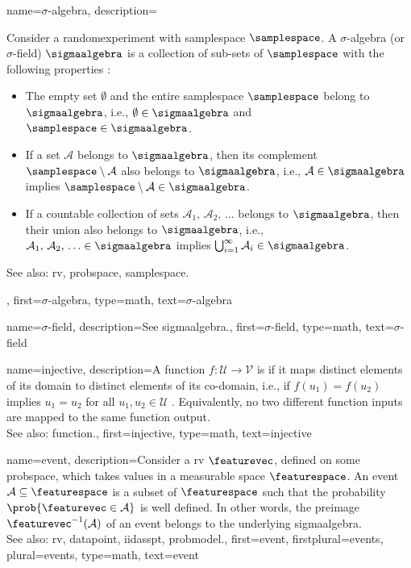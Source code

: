 {name={$\sigma$-algebra}, 
	description={Consider a \gls{randomexperiment} with \gls{samplespace} $\samplespace$. 
		A $\sigma$-algebra (or $\sigma$-field) $\sigmaalgebra$ 
		is a collection of sub-sets of $\samplespace$ with the following properties 
		\cite{RudinBook,BillingsleyProbMeasure,durrett2010probability}:
		 \begin{itemize}
		 	\item The empty set $\emptyset$ and the entire \gls{samplespace} 
		 	$\samplespace$ belong to $\sigmaalgebra$, i.e., $\emptyset \in \sigmaalgebra$ and $\samplespace \in \sigmaalgebra$.
		 	\item If a set $\mathcal{A}$ belongs to $\sigmaalgebra$, then its complement 
		 	$\samplespace \setminus \mathcal{A}$ also belongs to $\sigmaalgebra$, i.e., 
		 	$\mathcal{A} \in \sigmaalgebra$ implies $\samplespace \setminus \mathcal{A} \in \sigmaalgebra$.
		 	\item If a countable collection of sets $\mathcal{A}_1, \,\mathcal{A}_2, \,\ldots$ belongs 
			to $\sigmaalgebra$, 
		 	then their union also belongs to $\sigmaalgebra$, i.e.,
		 	$\mathcal{A}_1, \,\mathcal{A}_2, \,\ldots \in \sigmaalgebra$ implies 
		 	$\bigcup_{i=1}^{\infty} \mathcal{A}_i \in \sigmaalgebra$.	
		 \end{itemize}			 
		See also: \gls{rv}, \gls{probspace}, \gls{samplespace}.},
	first={$\sigma$-algebra},
	type=math, 
	text={$\sigma$-algebra} 
}

{name={$\sigma$-field}, 
	description={See \gls{sigmaalgebra}.}, 
	first={$\sigma$-field},
	type=math,
	text={$\sigma$-field} 
}


{name={injective}, 
	description={A \gls{function} $f: \mathcal{U} \rightarrow \mathcal{V}$ is 
	if it maps distinct elements of its \gls{domain} to distinct elements 
	of its \gls{co-domain}, 
    i.e., if $f(u_1) = f(u_2)$ implies $u_1 = u_2$ for all $u_1, u_2 \in \mathcal{U}$ 
        \cite{HalmosSet}. 
    Equivalently, no two different \gls{function} inputs are mapped to the same \gls{function} output.
				\\
		See also: \gls{function}.},
	first={injective},
	type=math,
	text={injective} 
}


{name={event}, 
	description={Consider a \gls{rv} $\featurevec$, defined on some \gls{probspace}, 
		which takes values in a \gls{measurable} space $\featurespace$. An 
		event $\mathcal{A} \subseteq \featurespace$ is a subset of $\featurespace$ 
		such that the \gls{probability} $\prob{\featurevec \in \mathcal{A}}$ is well 
		defined. In other words, the \gls{preimage} $\featurevec^{-1}(\mathcal{A})$ 
		of an event belongs to the underlying \gls{sigmaalgebra}. 
				\\
		See also: \gls{rv}, \gls{datapoint}, \gls{iidasspt}, \gls{probmodel}.},
	first={event},
	firstplural={events},
	plural={events},
	type=math,
	text={event} 
}

